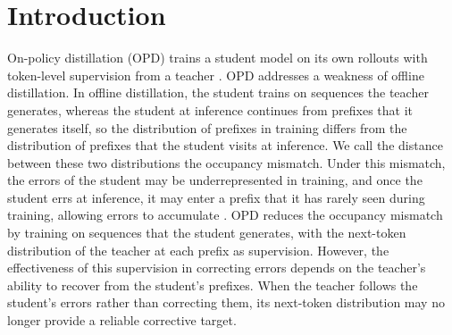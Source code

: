 


\section{Introduction}
\label{sec:intro}


On-policy distillation (OPD) trains a student model on its own rollouts with token-level supervision from a teacher \citep{agarwal2024onpolicy, gu2023minillm}. OPD addresses a weakness of offline distillation. In offline distillation, the student trains on sequences the teacher generates, whereas the student at inference continues from prefixes that it generates itself, so the distribution of prefixes in training differs from the distribution of prefixes that the student visits at inference. We call the distance between these two distributions the occupancy mismatch. Under this mismatch, the errors of the student may be underrepresented in training, and once the student errs at inference, it may enter a prefix that it has rarely seen during training, allowing errors to accumulate \citep{ross2011dagger, agarwal2024onpolicy}. OPD reduces the occupancy mismatch by training on sequences that the student generates, with the next-token distribution of the teacher at each prefix as supervision. However, the effectiveness of this supervision in correcting errors depends on the teacher's ability to recover from the student's prefixes. When the teacher follows the student's errors rather than correcting them, its next-token distribution may no longer provide a reliable corrective target.


